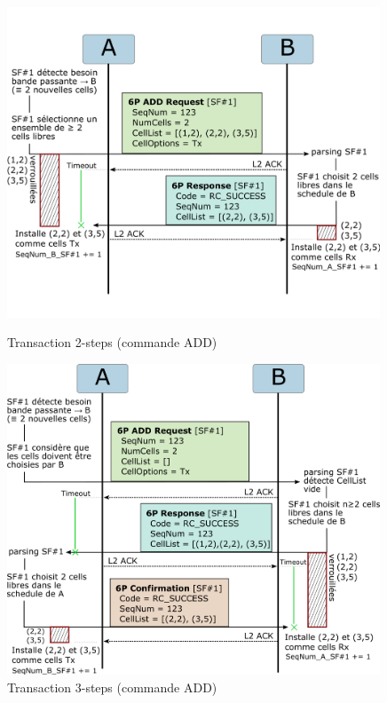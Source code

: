 \documentclass[]{report}
\begin{document}
\begin{figure}[!ht]
	\centering
	\begin{minipage}{0.5\textwidth}

		\includegraphics[width=0.99\textwidth]{6P_2-steps}
		\caption{Transaction 2-steps (commande ADD)}
		\label{fig:2-steps}
	\end{minipage}\hfill
	\begin{minipage}{0.5\textwidth}
        \centering
        \hfill
		\includegraphics[width=0.99\textwidth]{6P_3-steps}
		\caption{Transaction 3-steps (commande ADD)}
		\label{fig:3-steps}
	\end{minipage}	
\end{figure}
\end{document}
